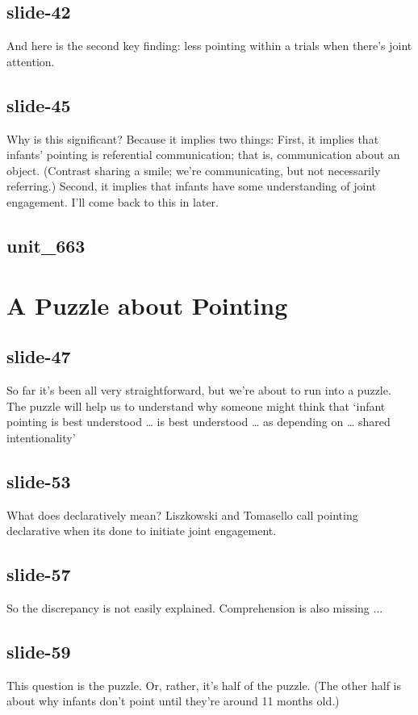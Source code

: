 \documentclass[12pt,\papersize]{extarticle}
\begin{document}
 
\subsection{slide-42}
And here is the second key finding: less pointing within a trials when there's joint attention.
 
 
\subsection{slide-45}
Why is this significant?
Because it implies two things:
First, it implies that infants' pointing is referential communication; that is, communication about an object.
(Contrast sharing a smile; we're communicating, but not necessarily referring.)
Second, it implies that infants have some understanding of joint engagement.
I'll come back to this in later.
 
 
\subsection{unit\_663}
 
\section{A Puzzle about Pointing}
 
 
\subsection{slide-47}
So far it's been all very straightforward, but we're about to run into a puzzle.
The puzzle will help us to understand why someone might think that ‘infant pointing is best understood … is best understood … as depending on … shared intentionality’
 
 
\subsection{slide-53}
What does declaratively mean? Liszkowski and Tomasello call pointing declarative when its done to initiate joint engagement.
 
 
\subsection{slide-57}
So the discrepancy is not easily explained.
Comprehension is also missing ...
 
 
\subsection{slide-59}
This question is the puzzle. Or, rather, it's half of the puzzle. (The other half is about why infants don't point until they're around 11 months old.)
 
\end{document}
